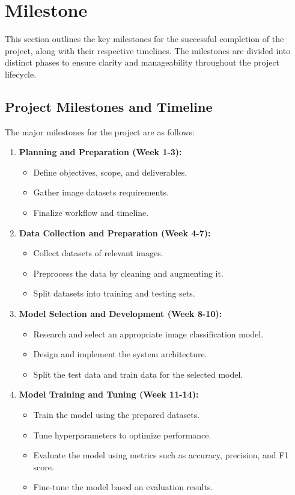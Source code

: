 \section{Milestone}
This section outlines the key milestones for the successful completion of the project, along with their respective timelines. The milestones are divided into distinct phases to ensure clarity and manageability throughout the project lifecycle.

\subsection{Project Milestones and Timeline}
The major milestones for the project are as follows:
\begin{enumerate}
    \item \textbf{Planning and Preparation (Week 1-3):}
    \begin{itemize}
        \item Define objectives, scope, and deliverables.
        \item Gather image datasets requirements.
        \item Finalize workflow and timeline.
    \end{itemize}
    
    \item \textbf{Data Collection and Preparation (Week 4-7):}
    \begin{itemize}
        \item Collect datasets of relevant images.
        \item Preprocess the data by cleaning and augmenting it.
        \item Split datasets into training and testing sets.
    \end{itemize}
    
    \item \textbf{Model Selection and Development (Week 8-10):}
    \begin{itemize}
        \item Research and select an appropriate image classification model.
        \item Design and implement the system architecture.
        \item Split the test data and train data for the selected model.
    \end{itemize}
    
    \item \textbf{Model Training and Tuning (Week 11-14):}
    \begin{itemize}
        \item Train the model using the prepared datasets.
        \item Tune hyperparameters to optimize performance.
        \item Evaluate the model using metrics such as accuracy, precision, and F1 score.
        \item Fine-tune the model based on evaluation results.
    \end{itemize}
    

\end{enumerate}
